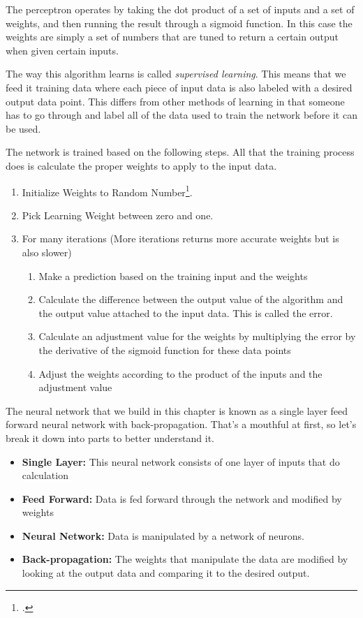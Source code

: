\documentclass{memoir}
\begin{document}
	The perceptron operates by taking the dot product of a set of inputs and a set of weights, and then running the result through a sigmoid function. In this case the weights are simply a set of numbers that are tuned to return a certain output when given certain inputs.

	The way this algorithm learns is called \emph{supervised learning}. This means that we feed it training data where each piece of input data is also labeled with a desired output data point. This differs from other methods of learning in that someone has to go through and label all of the data used to train the network before it can be used.

	The network is trained based on the following steps. All that the training process does is calculate the proper weights to apply to the input data.

	\begin{enumerate}
		\item Initialize Weights to Random Number\footcite{perceptron}.
		\item Pick Learning Weight between zero and one.
		\item For many iterations (More iterations returns more accurate weights but is also slower)%
		      \begin{enumerate}
		      	\item Make a prediction based on the training input and the weights
		      	\item Calculate the difference between the output value of the algorithm and the output value attached to the input data. This is called the error.
		      	\item Calculate an adjustment value for the weights by multiplying the error by the derivative of the sigmoid function for these data points
		      	\item Adjust the weights according to the product of the inputs and the adjustment value
		      \end{enumerate}
	\end{enumerate}

	The neural network that we build in this chapter is known as a single layer feed forward neural network with back-propagation. That's a mouthful at first, so let's break it down into parts to better understand it.

	\begin{itemize}
		\item \textbf{Single Layer:} This neural network consists of one layer of inputs that do calculation
		\item \textbf{Feed Forward:} Data is fed forward through the network and modified by weights
		\item \textbf{Neural Network:} Data is manipulated by a network of neurons.
		\item \textbf{Back-propagation:} The weights that manipulate the data are modified by looking at the output data and comparing it to the desired output.
	\end{itemize}
\end{document}
